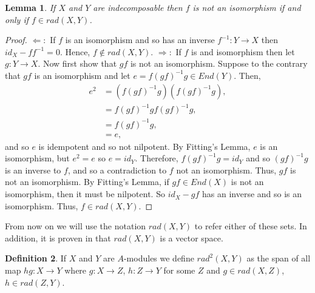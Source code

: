 \documentclass[11.5pt, twoside, a4paper, titlepage]{report}
\theoremstyle{definition}
\newtheorem{mydef}{Definition}[section]
\theoremstyle{plain}
\newtheorem{lem}[mydef]{Lemma}
\begin{document}
\begin{lem} \label{isoradlem}
If $X$ and $Y$ are indecomposable then $f$ is not an isomorphism if and only if $f \in rad(X,Y)$.
\end{lem}
\begin{proof}
$\Leftarrow:$ If $f$ is an isomorphism and so has an inverse $f^{-1}: Y \to X$ then $id_X - ff^{-1}=0$. Hence, $f\notin rad(X,Y)$.
$\Rightarrow:$ If $f $ is and isomorphism then let $g: Y \to X$. Now first show that $gf$ is not an isomorphism. Suppose to the contrary that $gf$ is an isomorphism and let $e=f(gf)^{-1}g \in End(Y)$. Then,
\begin{align*}
e^2&=(f(gf)^{-1}g)(f(gf)^{-1}g),\\
&=f(gf)^{-1}gf(gf)^{-1}g,\\
&=f(gf)^{-1}g,\\
&=e,
\end{align*}
and so $e$ is idempotent and so not nilpotent. By Fitting's Lemma, $e$ is an isomorphism, but $e^2=e$ so $e=id_Y$. Therefore, $f(gf)^{-1}g=id_Y$ and so $(gf)^{-1}g$ is an inverse to $f$, and so a contradiction to $f$ not an isomorphism. Thus, $gf$ is not an isomorphism. By Fitting's Lemma, if $gf\in End(X)$ is not an isomorphism, then it must be nilpotent. So $id_X -gf$ has an inverse and so is an isomorphism. Thus, $f\in rad(X,Y)$.
\end{proof}

From now on we will use the notation $rad(X,Y)$ to refer either of these sets. In addition, it is proven in \cite{Vale} that $rad(X,Y)$ is a vector space.

\begin{mydef} \label{rad2def}
If $X$ and $Y$ are $A$-modules we define $rad^2(X,Y)$ as the span of all map $hg:X \to Y$ where $g: X \to Z$, $h: Z \to Y$ for some $Z$ and $g \in rad(X,Z)$, $h\in rad(Z, Y)$.
\end{mydef}
\end{document}
